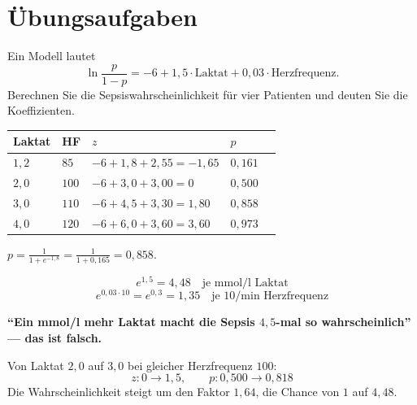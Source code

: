 \section{Übungsaufgaben}

\begin{aufgabe}
Ein Modell lautet
\[ \ln\frac{p}{1-p} = -6 + 1{,}5\cdot\text{Laktat} + 0{,}03\cdot\text{Herzfrequenz} . \]
Berechnen Sie die Sepsiswahrscheinlichkeit für vier Patienten und deuten Sie die Koeffizienten.

\loesung
{}
\begin{center}
{\small
\renewcommand{\arraystretch}{1.48}
\begin{tabular}{@{}P{1.4cm}P{1.2cm}P{3.0cm}P{1.2cm}P{1.2cm}@{}}
\toprule
\textbf{Laktat} & \textbf{HF} & $z$ & $p$ & \\
\midrule
$1{,}2$ & $85$ & $-6+1{,}8+2{,}55 = -1{,}65$ & $0{,}161$ & \\
$2{,}0$ & $100$ & $-6+3{,}0+3{,}00 = 0$ & $0{,}500$ & \\
$3{,}0$ & $110$ & $-6+4{,}5+3{,}30 = 1{,}80$ & $0{,}858$ & \\
$4{,}0$ & $120$ & $-6+6{,}0+3{,}60 = 3{,}60$ & $0{,}973$ & \\
\bottomrule
\end{tabular}}
\end{center}

 $p = \frac{1}{1+e^{-1{,}8}} = \frac{1}{1+0{,}165} = 0{,}858$.

\[ e^{1{,}5} = 4{,}48 \quad\text{je mmol/l Laktat} \]
\[ e^{0{,}03\cdot10} = e^{0{,}3} = 1{,}35 \quad\text{je $10$/min Herzfrequenz} \]

\begin{center}
\begin{minipage}{0.9\textwidth}
\textbf{\enquote{Ein mmol/l mehr Laktat macht die Sepsis $4{,}5$-mal so wahrscheinlich} --- das ist falsch.}
\end{minipage}
\end{center}

 Von Laktat $2{,}0$ auf $3{,}0$ bei gleicher Herzfrequenz $100$:
\[ z: 0 \to 1{,}5, \qquad p: 0{,}500 \to 0{,}818 \]
Die Wahrscheinlichkeit steigt um den Faktor $1{,}64$, die Chance von $1$ auf $4{,}48$.

\begin{center}
\begin{minipage}{0.88\textwidth}
\end{minipage}
\end{center}
\end{aufgabe}

